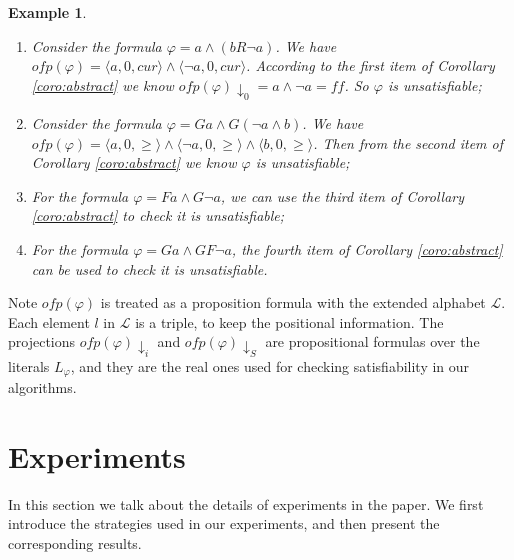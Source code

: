 \documentclass[conference]{IEEEtran}
\newtheorem{example}{Example}
\def\phi{\varphi}
\def\ff{\mathit{ff}}
\def\ofp#1{\mathit{ofp}(#1)}
\def\nondeter{\perp}
\def\cur{\mathit{cur}}
\begin{document}
\begin{example}
  \begin{enumerate}
  \item Consider the formula $\phi=a\wedge (b R \neg a)$. We have
    $\ofp{\phi}=\langle a, 0, \cur\rangle\wedge\langle \neg a, 0,
    \cur\rangle$. According to the first item of Corollary
    \ref{coro:abstract} we know $\ofp{\phi}\downarrow_0=a\wedge\neg
    a=\ff$. So $\phi$ is unsatisfiable;
  \item Consider the formula $\phi= Ga \wedge G(\neg a\wedge b)$. We
    have $\ofp{\phi}=\langle a, 0, \geq\rangle\wedge\langle \neg a,
    0, \geq\rangle\wedge\langle b, 0, \geq\rangle$. Then from the
    second item of Corollary \ref{coro:abstract} we know $\phi$ is
    unsatisfiable;
    \item For the formula $\phi=F a\wedge G\neg a$, we can use the third item of Corollary 
    \ref{coro:abstract} to check it is unsatisfiable;
    \item For the formula $\phi=Ga \wedge GF\neg a$, the fourth item of Corollary 
    \ref{coro:abstract} can be used to check it is unsatisfiable.
  \end{enumerate}
\iffalse
  Consider the pattern formula 
  $\phi=\bigwedge_{1\leq i\leq n}FG(a_i\leftrightarrow a_{i+1})\wedge FG(a_{n+1}\leftrightarrow \neg a_1)$, apply our approach and we get $\ofp{\phi}=\bigwedge_{1\leq i\leq n}(l_i\leftrightarrow l_{i+1})\wedge (l_{n+1}\leftrightarrow \neg l_1)$, in which $l_i=\langle a_i, 
\nondeter, \geq\rangle (n+1\geq i\geq 1)$. Then according to the second strategy in Corollary \ref{coro:abstract} we can conclude 
  $\phi$ is unsatisfiable due to $\ofp{\phi}\downarrow_S=\ff$. As a result, the checking result is 
  benefit from the high performance of SAT solvers.
\fi
\end{example}

Note $\ofp{\phi}$ is treated as a proposition formula with the
extended alphabet $\mathcal{L}$. Each element $l$ in $\mathcal{L}$ is
a triple, to keep the positional information. The projections
$\ofp{\phi}\downarrow_i$ and $\ofp{\phi}\downarrow_S$ are
propositional formulas over the literals $L_\phi$, and they are the real ones used
for checking satisfiability in our algorithms.

\iffalse
\section{Experiments}\label{sec:exp}

In this section we talk about the details of experiments in the paper. We first introduce the 
strategies used in our experiments, and then present the corresponding results.  
\end{document}

